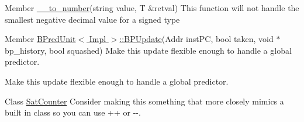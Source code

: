 \label{todo__todo000007}
\hypertarget{todo__todo000007}{}
 
\begin{DoxyDescription}
\item[Member \hyperlink{str_8cc_a62ee5dab740541c091921011e05068c7}{\_\-\_\-to\_\-number}(string value, T \&retval) ]This function will not handle the smallest negative decimal value for a signed type 
\end{DoxyDescription}

\label{todo__todo000001}
\hypertarget{todo__todo000001}{}
 
\begin{DoxyDescription}
\item[Member \hyperlink{classBPredUnit_a35c57ae0661f1d5dd2169e919741d47b}{BPredUnit$<$ Impl $>$::BPUpdate}(Addr instPC, bool taken, void $\ast$bp\_\-history, bool squashed) ]Make this update flexible enough to handle a global predictor. 

Make this update flexible enough to handle a global predictor. 
\end{DoxyDescription}

\label{todo__todo000006}
\hypertarget{todo__todo000006}{}
 
\begin{DoxyDescription}
\item[Class \hyperlink{classSatCounter}{SatCounter} ]Consider making this something that more closely mimics a built in class so you can use ++ or -\/-\/. 
\end{DoxyDescription}